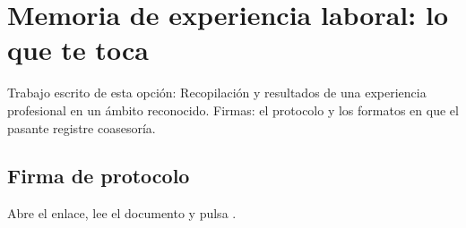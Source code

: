 \section{Memoria de experiencia laboral: lo que te toca}
Trabajo escrito de esta opción: Recopilación y resultados de una experiencia profesional en un ámbito reconocido. Firmas: el protocolo y los formatos en que el pasante registre coasesoría.
\subsection{Firma de protocolo}
Abre el enlace, lee el documento y pulsa .
